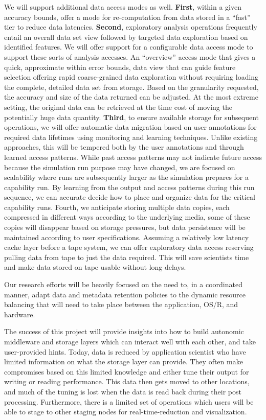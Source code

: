 \documentclass[11pt,letterpaper]{article}
\begin{document}
We will support additional data access modes as well. \textbf{First}, within a
given accuracy bounds, offer a mode for re-computation from data stored in a
``fast'' tier to reduce data latencies. \textbf{Second}, exploratory analysis
operations frequently entail an overall data set view followed by targeted data
exploration based on identified features. We will offer support for a
configurable data access mode to support these sorts of analysis accesses. An
``overview'' access mode that gives a quick, approximate within error bounds,
data view that can guide feature selection offering rapid coarse-grained data
exploration without requiring loading the complete, detailed data set from
storage. Based on the granularity requested, the accuracy and size of the data
returned can be adjusted. At the most extreme setting, the original data can
be retrieved at the time cost of moving the potentially huge data quantity.
\textbf{Third}, to ensure available storage for subsequent operations, we will
offer automatic data migration based on user annotations for required data
lifetimes using monitoring and learning techniques. Unlike existing approaches,
this will be tempered both by the user annotations and through learned access
patterns.  While past access patterns may not indicate future access because
the simulation run purpose may have changed, we are focused on scalability
where runs are subsequently larger as the simulation prepares for a capability
run.  By learning from the output and access patterns during this run sequence,
we can accurate decide how to place and organize data for the critical
capability runs. Fourth, we anticipate storing multiple data copies, each
compressed in different ways according to the underlying media, some of these
copies will disappear based on storage pressures, but data persistence will be
maintained according to user specifications. Assuming a relatively low latency
cache layer before a tape system, we can offer exploratory data access
reserving pulling data from tape to just the data required. This will save
scientists time and make data stored on tape usable without long delays.

Our research efforts will be heavily focused on the need to, in a coordinated
manner, adapt data and metadata retention policies to the dynamic resource
balancing that will need to take place between the application, OS/R, and
hardware.

The success of this project will  provide insights into how to build autonomic
middleware and storage layers which can interact well with each other, and take
user-provided hints. Today, data is reduced by application scientist who have
limited information on what the storage layer can provide. They often make
compromises based on this limited knowledge and either tune their output for
writing or reading performance. This data then gets moved to other locations,
and much of the tuning is lost when the data is read back during their post
processing. Furthermore, there is a limited set of operations which users will
be able to stage to other staging nodes for real-time-reduction and
visualization. 


%
\end{document}
